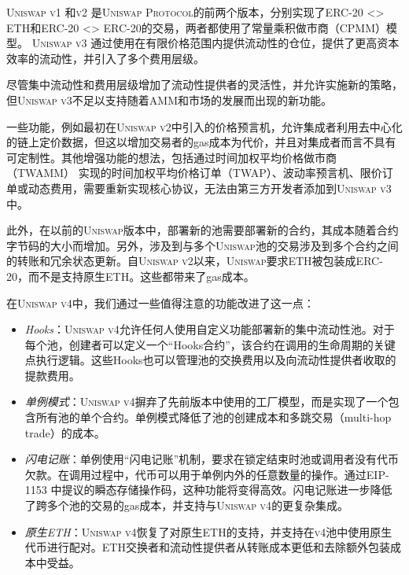 \documentclass[sigconf,nonacm,prologue,table]{acmart}
\numberwithin{equation}{section}
\theoremstyle{definition}
\theoremstyle{remark}
\begin{document}
\textsc{Uniswap v1} \cite{Adams18}和\textsc{v2} \cite{Adams20}是\textsc{Uniswap Protocol}的前两个版本，分别实现了ERC-20 <> ETH和ERC-20 <> ERC-20的交易，两者都使用了常量乘积做市商（CPMM）模型。 \textsc{Uniswap v3} \cite{Adams21}通过使用在有限价格范围内提供流动性的仓位，提供了更高资本效率的流动性，并引入了多个费用层级。

尽管集中流动性和费用层级增加了流动性提供者的灵活性，并允许实施新的策略，但\textsc{Uniswap v3}不足以支持随着AMM和市场的发展而出现的新功能。

一些功能，例如最初在\textsc{Uniswap v2}中引入的价格预言机，允许集成者利用去中心化的链上定价数据，但这以增加交易者的gas成本为代价，并且对集成者而言不具有可定制性。其他增强功能的想法，包括通过时间加权平均价格做市商（TWAMM） \cite{White2021} 实现的时间加权平均价格订单（TWAP）、波动率预言机、限价订单或动态费用，需要重新实现核心协议，无法由第三方开发者添加到\textsc{Uniswap v3}中。

此外，在以前的\textsc{Uniswap}版本中，部署新的池需要部署新的合约，其成本随着合约字节码的大小而增加。另外，涉及到与多个\textsc{Uniswap}池的交易涉及到多个合约之间的转账和冗余状态更新。自\textsc{Uniswap v2}以来，\textsc{Uniswap}要求ETH被包装成ERC-20，而不是支持原生ETH。这些都带来了gas成本。

在\textsc{Uniswap v4}中，我们通过一些值得注意的功能改进了这一点：
\begin{itemize}
    \item \emph{Hooks}：\textsc{Uniswap v4}允许任何人使用自定义功能部署新的集中流动性池。对于每个池，创建者可以定义一个“Hooks合约”，该合约在调用的生命周期的关键点执行逻辑。这些Hooks也可以管理池的交换费用以及向流动性提供者收取的提款费用。
    \item \emph{单例模式}：\textsc{Uniswap v4}摒弃了先前版本中使用的工厂模型，而是实现了一个包含所有池的单个合约。单例模式降低了池的创建成本和多跳交易（multi-hop trade）的成本。
    \item \emph{闪电记账}：单例使用“闪电记账”机制，要求在锁定结束时池或调用者没有代币欠款。在调用过程中，代币可以用于单例内外的任意数量的操作。通过EIP-1153 \cite{Akhunov2018}中提议的瞬态存储操作码，这种功能将变得高效。闪电记账进一步降低了跨多个池的交易的gas成本，并支持与\textsc{Uniswap v4}的更复杂集成。
    \item \emph{原生ETH}：\textsc{Uniswap v4}恢复了对原生ETH的支持，并支持在\textsc{v4}池中使用原生代币进行配对。ETH交换者和流动性提供者从转账成本更低和去除额外包装成本中受益。
\end{itemize}
\end{document}
